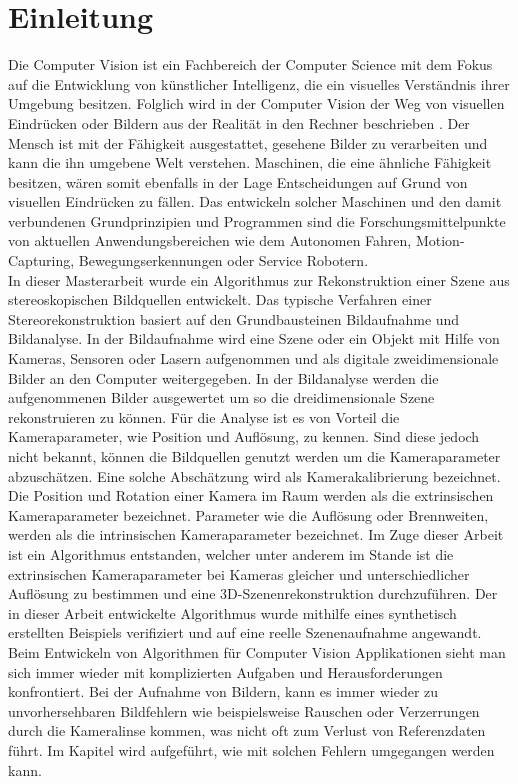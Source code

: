 \chapter{Einleitung}
\label{sec:einleitung} 




Die Computer Vision ist ein Fachbereich der Computer Science mit dem Fokus auf die Entwicklung von künstlicher Intelligenz, die ein visuelles Verständnis ihrer Umgebung besitzen. Folglich wird in der Computer Vision der Weg von visuellen Eindrücken oder Bildern aus der Realität in den Rechner beschrieben \cite{ComputerVision}. Der Mensch ist mit der Fähigkeit ausgestattet, gesehene Bilder zu verarbeiten und  kann die ihn umgebene Welt verstehen. Maschinen, die eine ähnliche Fähigkeit besitzen, wären somit ebenfalls in der Lage Entscheidungen auf Grund von visuellen Eindrücken zu fällen. Das entwickeln solcher Maschinen und den damit verbundenen Grundprinzipien und Programmen sind die Forschungsmittelpunkte von aktuellen Anwendungsbereichen wie dem Autonomen Fahren, Motion-Capturing, Bewegungserkennungen oder Service Robotern.\\

In dieser Masterarbeit wurde ein Algorithmus zur Rekonstruktion einer Szene aus stereoskopischen Bildquellen entwickelt. Das typische Verfahren einer Stereorekonstruktion basiert auf den Grundbausteinen Bildaufnahme und Bildanalyse\cite{ComputerVision}. In der Bildaufnahme wird eine Szene oder ein Objekt mit Hilfe von Kameras, Sensoren oder Lasern aufgenommen und als digitale zweidimensionale Bilder an den Computer weitergegeben. In der Bildanalyse werden die aufgenommenen Bilder ausgewertet um so die dreidimensionale Szene rekonstruieren zu können. Für die Analyse ist es von Vorteil die Kameraparameter, wie Position und Auflösung, zu kennen. Sind diese jedoch nicht bekannt, können die Bildquellen genutzt werden um die Kameraparameter abzuschätzen. Eine solche Abschätzung wird als Kamerakalibrierung\cite{HZ,Ferid,Elements,ZZGXr} bezeichnet. Die Position und Rotation einer Kamera im Raum werden als die extrinsischen Kameraparameter bezeichnet. Parameter wie die Auflösung oder Brennweiten, werden als die intrinsischen Kameraparameter bezeichnet\cite{HZ,Ferid}. Im Zuge dieser Arbeit ist ein Algorithmus entstanden, welcher unter anderem im Stande ist die extrinsischen Kameraparameter bei Kameras gleicher und unterschiedlicher Auflösung zu bestimmen und eine 3D-Szenenrekonstruktion durchzuführen. Der in dieser Arbeit entwickelte Algorithmus wurde mithilfe eines synthetisch erstellten Beispiels verifiziert und auf eine reelle Szenenaufnahme angewandt. Beim Entwickeln von Algorithmen für Computer Vision Applikationen sieht man sich immer wieder mit komplizierten Aufgaben und Herausforderungen konfrontiert. Bei der Aufnahme von Bildern, kann es immer wieder zu unvorhersehbaren Bildfehlern wie beispielsweise Rauschen oder Verzerrungen durch die Kameralinse kommen, was nicht oft zum Verlust von Referenzdaten führt. Im Kapitel  wird aufgeführt, wie mit solchen Fehlern umgegangen werden kann.\\

